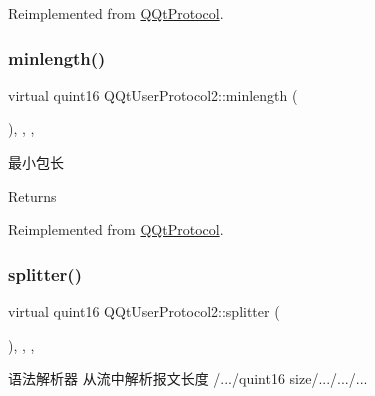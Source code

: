 Reimplemented from \mbox{\hyperlink{class_q_qt_protocol_af41bc3116abbbcfc9af45e151a253ff7}{Q\+Qt\+Protocol}}.

\mbox{\label{class_q_qt_user_protocol2_a2dafc33ffca68e757710f118093b02e9}} 
\subsubsection{\texorpdfstring{minlength()}{minlength()}}
{\footnotesize\ttfamily virtual quint16 Q\+Qt\+User\+Protocol2\+::minlength (\begin{DoxyParamCaption}{ }\end{DoxyParamCaption})\hspace{0.3cm}{\ttfamily [inline]}, {\ttfamily [override]}, {\ttfamily [protected]}, {\ttfamily [virtual]}}



最小包长 

\begin{DoxyReturn}{Returns}

\end{DoxyReturn}


Reimplemented from \mbox{\hyperlink{class_q_qt_protocol_a2b00f53d3dd0eed817eeecff422891f3}{Q\+Qt\+Protocol}}.

\mbox{\label{class_q_qt_user_protocol2_a58e1ba58e6c0eca4fa4c17b6d987aa50}} 
\subsubsection{\texorpdfstring{splitter()}{splitter()}}
{\footnotesize\ttfamily virtual quint16 Q\+Qt\+User\+Protocol2\+::splitter (\begin{DoxyParamCaption}\item[{const Q\+Byte\+Array \&}]{ }\end{DoxyParamCaption})\hspace{0.3cm}{\ttfamily [inline]}, {\ttfamily [override]}, {\ttfamily [protected]}, {\ttfamily [virtual]}}



语法解析器 从流中解析报文长度 /.../quint16 size/.../.../... 


